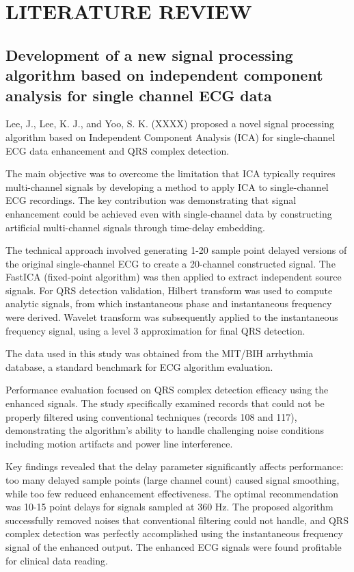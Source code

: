 \chapter{LITERATURE REVIEW}

\section{Development of a new signal processing algorithm based on independent component analysis for single channel ECG data \cite{paper_1}}
Lee, J., Lee, K. J., and Yoo, S. K. (XXXX) proposed a novel signal processing algorithm based on Independent Component Analysis (ICA) for single-channel ECG data enhancement and QRS complex detection.

The main objective was to overcome the limitation that ICA typically requires multi-channel signals by developing a method to apply ICA to single-channel ECG recordings. The key contribution was demonstrating that signal enhancement could be achieved even with single-channel data by constructing artificial multi-channel signals through time-delay embedding.

The technical approach involved generating 1-20 sample point delayed versions of the original single-channel ECG to create a 20-channel constructed signal. The FastICA (fixed-point algorithm) was then applied to extract independent source signals. For QRS detection validation, Hilbert transform was used to compute analytic signals, from which instantaneous phase and instantaneous frequency were derived. Wavelet transform was subsequently applied to the instantaneous frequency signal, using a level 3 approximation for final QRS detection.

The data used in this study was obtained from the MIT/BIH arrhythmia database, a standard benchmark for ECG algorithm evaluation.

Performance evaluation focused on QRS complex detection efficacy using the enhanced signals. The study specifically examined records that could not be properly filtered using conventional techniques (records 108 and 117), demonstrating the algorithm's ability to handle challenging noise conditions including motion artifacts and power line interference.

Key findings revealed that the delay parameter significantly affects performance: too many delayed sample points (large channel count) caused signal smoothing, while too few reduced enhancement effectiveness. The optimal recommendation was 10-15 point delays for signals sampled at 360 Hz. The proposed algorithm successfully removed noises that conventional filtering could not handle, and QRS complex detection was perfectly accomplished using the instantaneous frequency signal of the enhanced output. The enhanced ECG signals were found profitable for clinical data reading.

